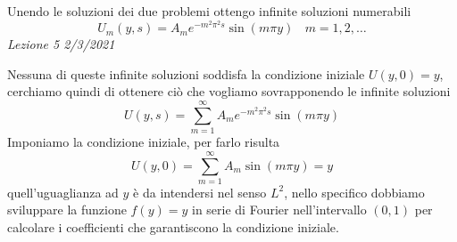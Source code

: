 \documentclass[10pt,a4paper,twoside,openright]{book}
\begin{document}
Unendo le soluzioni dei due problemi ottengo infinite soluzioni numerabili
\begin{equation*}
U_{m}(y,s) =A_{m} e^{-m^{2} \pi ^{2} s}\sin(m\pi y) \ \ \ \ m=1,2,\dotsc 
\end{equation*}
\textit{Lezione 5 2/3/2021}

Nessuna di queste infinite soluzioni soddisfa la condizione iniziale $U(y,0) =y$, cerchiamo quindi di ottenere ciò che vogliamo sovrapponendo le infinite soluzioni
\begin{equation*}
\boxed{U(y,s) =\sum\limits ^{\infty }_{m=1} A_{m} e^{-m^{2} \pi ^{2} s}\sin(m\pi y)}
\end{equation*}
Imponiamo la condizione iniziale, per farlo risulta
\begin{equation}
U(y,0) =\sum\limits ^{\infty }_{m=1} A_{m}\sin(m\pi y) =y
\label{eq:diff-cond-iniziale}
\end{equation}
quell'uguaglianza ad $y$ è da intendersi nel senso $L^{2}$, nello specifico dobbiamo sviluppare la funzione $f(y) =y$ in serie di Fourier nell'intervallo $(0,1)$ per calcolare i coefficienti che garantiscono la condizione iniziale.
\end{document}
